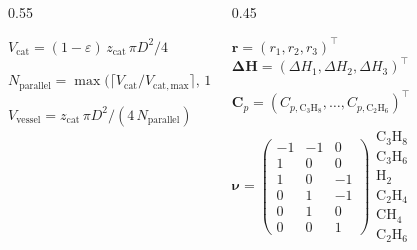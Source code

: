 \begin{frame}[t]
\begin{columns}[T,onlytextwidth]
\begin{column}{0.55\textwidth}
{       \vspace{0.85em}
       $\displaystyle V_{\mathrm{cat}}=(1-\varepsilon)\,z_{\mathrm{cat}}\,\pi D^2/4$\par
       \vspace{0.85em}
       $\displaystyle N_{\mathrm{parallel}}=\max\!\big(\lceil V_{\mathrm{cat}}/V_{\mathrm{cat,max}}\rceil,\,1\big)$\par
       \vspace{0.85em}
       $\displaystyle V_{\mathrm{vessel}}=z_{\mathrm{cat}}\,\pi D^2/(4\,N_{\mathrm{parallel}})$\par}
    \end{column}

    \begin{column}{0.45\textwidth}
      {\tiny
       {\centering{}\par}
       \vspace{0.2em}
       {\centering$\boldsymbol{r}=(r_1,r_2,r_3)^{\!\top}$\quad
        $\boldsymbol{\Delta H}=(\Delta H_1,\Delta H_2,\Delta H_3)^{\!\top}$\par}
       \vspace{0.15em}
       {\centering$\boldsymbol{C}_p=(C_{p,\mathrm{C_3H_8}},\dots,C_{p,\mathrm{C_2H_6}})^{\!\top}$\par}
       \vspace{0.25em}
       {\centering$\displaystyle
         \boldsymbol{\nu}=
         \begin{pmatrix}
           -1 & -1 &  0 \\ 1 & 0 & 0 \\ 1 & 0 & -1 \\
            0 &  1 & -1 \\ 0 & 1 & 0 \\ 0 & 0 & 1
         \end{pmatrix}
         \begin{matrix}
           \mathrm{C_3H_8}\\\mathrm{C_3H_6}\\\mathrm{H_2}\\
           \mathrm{C_2H_4}\\\mathrm{CH_4}\\\mathrm{C_2H_6}
         \end{matrix}$\par}
      }


\end{column}
\end{columns}
\end{frame}

